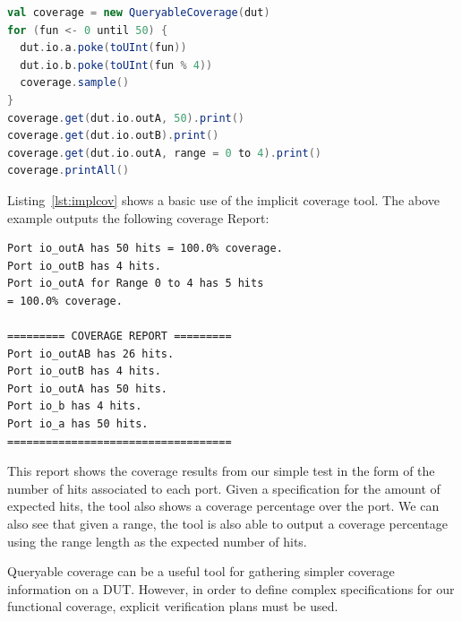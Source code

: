 \documentclass[conference]{IEEEtran}
\begin{document}
\begin{lstlisting}[captionpos=b,caption={Example use of Queryable coverage in order to gain information about the DUT's testing process. Note that \texttt{outA} and \texttt{outB} simply output the values of \texttt{a} and \texttt{b}.},label={lst:implcov},language=scala]
val coverage = new QueryableCoverage(dut)
for (fun <- 0 until 50) {
  dut.io.a.poke(toUInt(fun))
  dut.io.b.poke(toUInt(fun % 4))
  coverage.sample()
}
coverage.get(dut.io.outA, 50).print()
coverage.get(dut.io.outB).print()
coverage.get(dut.io.outA, range = 0 to 4).print()
coverage.printAll()
\end{lstlisting}
Listing~\ref{lst:implcov} shows a basic use of the implicit coverage tool. 
The above example outputs the following coverage Report:  
\begin{verbatim}
Port io_outA has 50 hits = 100.0% coverage.
Port io_outB has 4 hits.
Port io_outA for Range 0 to 4 has 5 hits 
= 100.0% coverage.  

========= COVERAGE REPORT ========= 
Port io_outAB has 26 hits.
Port io_outB has 4 hits.
Port io_outA has 50 hits.
Port io_b has 4 hits.
Port io_a has 50 hits.
===================================
\end{verbatim}
This report shows the coverage results from our simple test in the form of the number of hits associated to each port.
Given a specification for the amount of expected hits, the tool also shows a coverage percentage over the port.
We can also see that given a range, the tool is also able to output a coverage percentage using the range length as the expected number of hits.

Queryable coverage can be a useful tool for gathering simpler coverage information on a DUT.
However, in order to define complex specifications for our functional coverage, explicit verification plans must be used.
\end{document}
